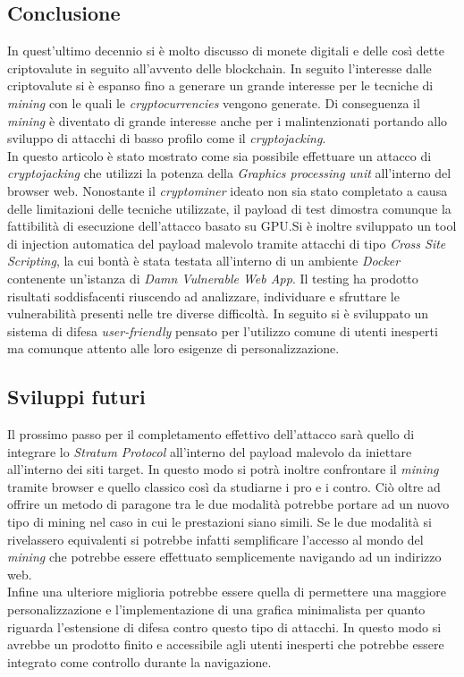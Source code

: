 \documentclass[conference, italian]{IEEEtran}
\begin{document}
\subsection{Conclusione}\label{sec:conclusion}
In quest'ultimo decennio si è molto discusso di monete digitali e delle così dette criptovalute in seguito all'avvento delle blockchain. In seguito l'interesse dalle criptovalute si è espanso fino a generare un grande interesse per le tecniche di \emph{mining} con le quali le \emph{cryptocurrencies} vengono generate. Di conseguenza il \emph{mining} è diventato di grande interesse anche per i malintenzionati portando allo sviluppo di attacchi di basso profilo come il \emph{cryptojacking}.\\
In questo articolo è stato mostrato come sia possibile effettuare un attacco di \emph{cryptojacking} che utilizzi la potenza della \emph{Graphics processing unit} all'interno del browser web. Nonostante il \emph{cryptominer} ideato non sia stato completato a causa delle limitazioni delle tecniche utilizzate, il payload di test dimostra comunque la fattibilità di esecuzione dell'attacco basato su GPU.\@ Si è inoltre sviluppato un tool di injection automatica del payload malevolo tramite attacchi di tipo \emph{Cross Site Scripting}, la cui bontà è stata testata all'interno di un ambiente \emph{Docker} contenente un'istanza di \emph{Damn Vulnerable Web App}. Il testing ha prodotto risultati soddisfacenti riuscendo ad analizzare, individuare e sfruttare le vulnerabilità presenti nelle tre diverse difficoltà. In seguito si è sviluppato un sistema di difesa \emph{user-friendly} pensato per l'utilizzo comune di utenti inesperti ma comunque attento alle loro esigenze di personalizzazione.

\subsection{Sviluppi futuri}\label{sec:future-works}
Il prossimo passo per il completamento effettivo dell'attacco sarà quello di integrare lo \emph{Stratum Protocol} all'interno del payload malevolo da iniettare all'interno dei siti target. In questo modo si potrà inoltre confrontare il \emph{mining} tramite browser e quello classico così da studiarne i pro e i contro. Ciò oltre ad offrire un metodo di paragone tra le due modalità potrebbe portare ad un nuovo tipo di mining nel caso in cui le prestazioni siano simili. Se le due modalità si rivelassero equivalenti si potrebbe infatti semplificare l'accesso al mondo del \emph{mining} che potrebbe essere effettuato semplicemente navigando ad un indirizzo web.\\
Infine una ulteriore miglioria potrebbe essere quella di permettere una maggiore personalizzazione e l'implementazione di una grafica minimalista per quanto riguarda l'estensione di difesa contro questo tipo di attacchi. In questo modo si avrebbe un prodotto finito e accessibile agli utenti inesperti che potrebbe essere integrato come controllo durante la navigazione.
\end{document}
